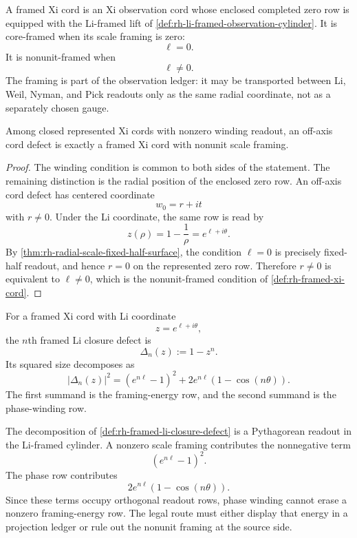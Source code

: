 \begin{definition}
\label{def:rh-framed-xi-cord}
A framed Xi cord is an Xi observation cord whose enclosed completed
zero row is equipped with the Li-framed lift of
\autoref{def:rh-li-framed-observation-cylinder}.  It is core-framed
when its scale framing is zero:
$$
\ell=0.
$$
It is nonunit-framed when
$$
\ell\ne0.
$$
The framing is part of the observation ledger: it may be transported
between Li, Weil, Nyman, and Pick readouts only as the same radial
coordinate, not as a separately chosen gauge.
\end{definition}

\begin{theorem}
\label{thm:rh-off-axis-cords-nonunit-framed}
Among closed represented Xi cords with nonzero winding readout, an
off-axis cord defect is exactly a framed Xi cord with nonunit scale
framing.
\end{theorem}

\begin{proof}
The winding condition is common to both sides of the statement.  The
remaining distinction is the radial position of the enclosed zero row.
An off-axis cord defect has centered coordinate
$$
w_0=r+it
$$
with $r\ne0$.  Under the Li coordinate, the same row is read by
$$
z(\rho)=1-\frac1\rho=e^{\ell+i\theta}.
$$
By \autoref{thm:rh-radial-scale-fixed-half-surface}, the condition
$\ell=0$ is precisely fixed-half readout, and hence $r=0$ on the
represented zero row.  Therefore $r\ne0$ is equivalent to
$\ell\ne0$, which is the nonunit-framed condition of
\autoref{def:rh-framed-xi-cord}.
\end{proof}

\begin{definition}
\label{def:rh-framed-li-closure-defect}
For a framed Xi cord with Li coordinate
$$
z=e^{\ell+i\theta},
$$
the $n$th framed Li closure defect is
$$
\Delta_n(z):=1-z^n.
$$
Its squared size decomposes as
$$
|\Delta_n(z)|^2
=
(e^{n\ell}-1)^2
+
2e^{n\ell}(1-\cos(n\theta)).
$$
The first summand is the framing-energy row, and the second summand is
the phase-winding row.
\end{definition}

\begin{principle}
\label{prin:rh-framing-energy-no-phase-cancellation}
The decomposition of
\autoref{def:rh-framed-li-closure-defect} is a Pythagorean readout in
the Li-framed cylinder.  A nonzero scale framing contributes the
nonnegative term
$$
(e^{n\ell}-1)^2.
$$
The phase row contributes
$$
2e^{n\ell}(1-\cos(n\theta)).
$$
Since these terms occupy orthogonal readout rows, phase winding cannot
erase a nonzero framing-energy row.  The legal route must either
display that energy in a projection ledger or rule out the nonunit
framing at the source side.
\end{principle}

